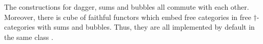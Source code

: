 \begin{remark}
The constructions for dagger, sums and bubbles all commute with each other.
Moreover, there is cube of faithful functors which embed free categories in free $\dagger$-categories with sums and bubbles.
Thus, they are all implemented by default in the same class .
\end{remark}
